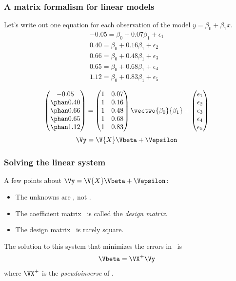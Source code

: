 \documentclass{beamer}
\begin{document}
\begin{frame}
\frametitle{A matrix formalism for linear models}
Let's write out one equation for each observation of the model $y = \beta_0 + \beta_1x$.
\begin{align*}
	-0.05 = \beta_0 + 0.07\beta_1 + \epsilon_1 \\
	0.40 = \beta_0 + 0.16\beta_1 + \epsilon_2 \\
	0.66 = \beta_0 + 0.48\beta_1 + \epsilon_3 \\
	0.65 = \beta_0 + 0.68\beta_1 + \epsilon_4 \\
	1.12 = \beta_0 + 0.83\beta_1 + \epsilon_5
\end{align*}

\pause
\[ \begin{pmatrix} -0.05\\ \phan0.40\\ \phan0.66\\ \phan0.65\\ \phan1.12 \end{pmatrix} = \begin{pmatrix} 1&0.07\\ 1&0.16\\ 1&0.48\\ 1&0.68\\ 1&0.83 \end{pmatrix} \vectwo{\beta_0}{\beta_1} + \begin{pmatrix} \epsilon_1\\ \epsilon_2\\ \epsilon_3\\ \epsilon_4\\ \epsilon_5 \end{pmatrix} \]
\pause
\[ \Vy = \V{X}\Vbeta+\Vepsilon \]	
\end{frame}

\begin{frame}
\frametitle{Solving the linear system}

A few points about $\Vy = \V{X}\Vbeta+\Vepsilon$:
\begin{itemize}
	\item The unknowns are \Vbeta, not .
	\item The coefficient matrix \ is called the \emph{design matrix}.
	\item The design matrix \ is rarely square.
\end{itemize}

\pause
The solution to this system that minimizes the errors in \Vepsilon\ is 
\[ \Vbeta = \VX^+\Vy \]
where $\VX^+$ is the \emph{pseudoinverse} of \VX.
\end{frame}
\end{document}
